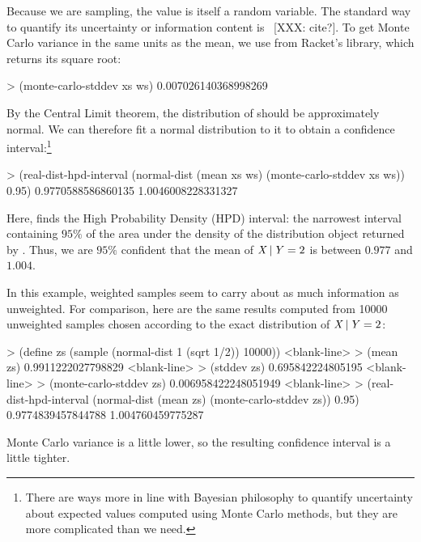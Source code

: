 Because we are sampling, the value  is itself a random variable.
The standard way to quantify its uncertainty or information content is ~[XXX: cite?].
To get Monte Carlo variance in the same units as the mean, we use  from Racket's  library, which returns its square root:
\begin{center}\singlespacing
\begin{schemedisplay}
> (monte-carlo-stddev xs ws)
0.007026140368998269
\end{schemedisplay}
\end{center}
By the Central Limit theorem, the distribution of  should be approximately normal.
We can therefore fit a normal distribution to it to obtain a confidence interval:\footnote{There are ways more in line with Bayesian philosophy to quantify uncertainty about expected values computed using Monte Carlo methods, but they are more complicated than we need.}
\begin{center}\singlespacing
\begin{schemedisplay}
> (real-dist-hpd-interval
   (normal-dist (mean xs ws) (monte-carlo-stddev xs ws))
   0.95)
0.9770588586860135
1.0046008228331327
\end{schemedisplay}
\end{center}
Here,  finds the High Probability Density (HPD) interval: the narrowest interval containing $95\%$ of the area under the density of the distribution object returned by .
Thus, we are $95\%$ confident that the mean of $\mathit{X} \,|\, \mathit{Y} = 2$ is between $0.977$ and $1.004$.

In this example, weighted samples seem to carry about as much information as unweighted.
For comparison, here are the same results computed from 10000 unweighted samples chosen according to the exact distribution of $\mathit{X} \,|\, \mathit{Y} = 2$:
\begin{center}\singlespacing
\begin{schemedisplay}
> (define zs (sample (normal-dist 1 (sqrt 1/2)) 10000))
<blank-line>
> (mean zs)
0.9911222027798829
<blank-line>
> (stddev zs)
0.695842224805195
<blank-line>
> (monte-carlo-stddev zs)
0.006958422248051949
<blank-line>
> (real-dist-hpd-interval
   (normal-dist (mean zs) (monte-carlo-stddev zs))
   0.95)
0.9774839457844788
1.004760459775287
\end{schemedisplay}
\end{center}
Monte Carlo variance is a little lower, so the resulting confidence interval is a little tighter.


